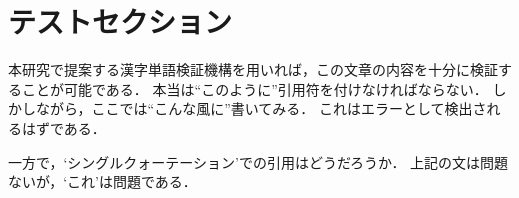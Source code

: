 \section{テストセクション}

本研究で提案する漢字単語検証機構を用いれば，この文章の内容を十分に検証することが可能である．
本当は``このように''引用符を付けなければならない．
しかしながら，ここでは“こんな風に”書いてみる．
これはエラーとして検出されるはずである．

一方で，`シングルクォーテーション'での引用はどうだろうか．
上記の文は問題ないが，‘これ’は問題である．
